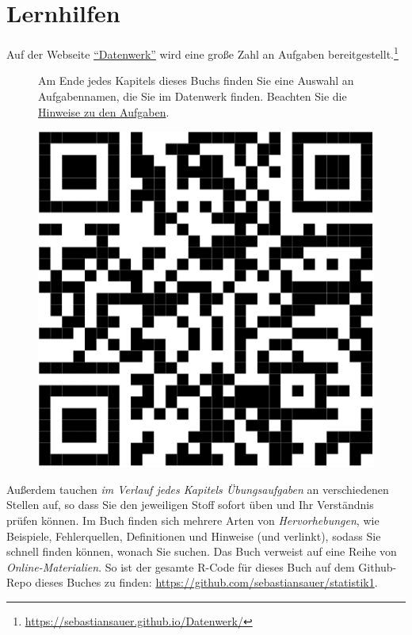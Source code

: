 \documentclass[
  letterpaper,
  twoside,
  open=any]{scrbook}
\theoremstyle{definition}
\theoremstyle{definition}
\theoremstyle{definition}
\theoremstyle{remark}
\begin{document}
\section{Lernhilfen}\label{lernhilfen}

Auf der Webseite
\href{https://sebastiansauer.github.io/Datenwerk/}{\enquote{Datenwerk}}
wird eine große Zahl an Aufgaben bereitgestellt.\footnote{\url{https://sebastiansauer.github.io/Datenwerk/}}

\begin{figure}

\begin{minipage}{0.80\linewidth}
Am Ende jedes Kapitels dieses Buchs finden Sie eine Auswahl an
Aufgabennamen, die Sie im Datenwerk finden. Beachten Sie die
\href{https://sebastiansauer.github.io/Datenwerk/hinweise}{Hinweise zu
den Aufgaben}.\end{minipage}%
%
\begin{minipage}{0.20\linewidth}

\begin{center}
\includegraphics[width=0.75\linewidth,height=\textheight,keepaspectratio]{005-orga_files/figure-pdf/unnamed-chunk-4-1.pdf}
\end{center}

\end{minipage}%

\end{figure}%

Außerdem tauchen \emph{im Verlauf jedes Kapitels Übungsaufgaben} an
verschiedenen Stellen auf, so dass Sie den jeweiligen Stoff sofort üben
und Ihr Verständnis prüfen können. Im Buch finden sich mehrere Arten von
\emph{Hervorhebungen}, wie Beispiele, Fehlerquellen, Definitionen und
Hinweise (und verlinkt), sodass Sie schnell finden können, wonach Sie
suchen. Das Buch verweist auf eine Reihe von \emph{Online-Materialien}.
So ist der gesamte R-Code für dieses Buch auf dem Github-Repo dieses
Buches zu finden: \url{https://github.com/sebastiansauer/statistik1}.
\end{document}
